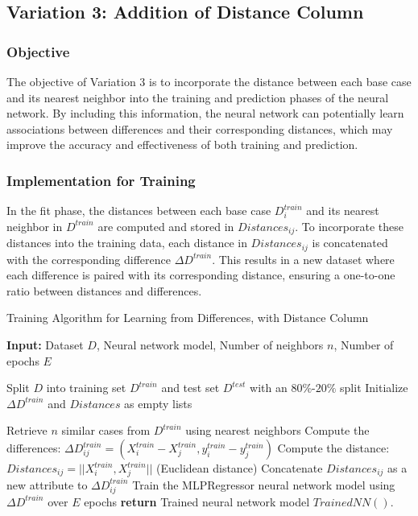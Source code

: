 \documentclass[a4paper, 12pt]{report}
\begin{document}
\subsection{Variation 3: Addition of Distance Column}

\subsubsection{Objective}
The objective of Variation 3 is to incorporate the distance between each base case and its nearest neighbor into the training and prediction phases of the neural network.
By including this information, the neural network can potentially learn associations between differences and their corresponding distances,
which may improve the accuracy and effectiveness of both training and prediction.

\subsubsection{Implementation for Training}
In the fit phase, the distances between each base case $D^{train}_i$ and its nearest neighbor in $D^{train}$ are computed and stored in $Distances_{ij}$.
To incorporate these distances into the training data, each distance in $Distances_{ij}$ is concatenated with the corresponding difference $\Delta D^{train}$.
This results in a new dataset where each difference is paired with its corresponding distance, ensuring a one-to-one ratio between distances and differences.

\begin{algorithm}[H]
    \caption{Training Algorithm for Learning from Differences, with Distance Column}
    \label{alg:learning_from_differences_variant_3_train}
    
    \textbf{Input:} Dataset $D$, Neural network model, Number of neighbors $n$, Number of epochs $E$
    
    \begin{algorithmic}[1]
        \State Split $D$ into training set $D^{train}$ and test set $D^{test}$ with an 80\%-$20\%$ split
        \State Initialize $\Delta D^{train}$ and $Distances$ as empty lists
        
            \State Retrieve $n$ similar cases from $D^{train}$ using nearest neighbors
                \State Compute the differences: $\Delta D^{train}_{ij} = (X^{train}_i - X^{train}_j, y^{train}_i - y^{train}_j)$
                \State Compute the distance: $Distances_{ij} = ||X^{train}_i, X^{train}_j||$ (Euclidean distance)
                \State Concatenate $Distances_{ij}$ as a new attribute to $\Delta D^{train}_{ij}$
            \EndFor
        \EndFor      
        \State Train the MLPRegressor neural network model using $\Delta D^{train}$ over $E$ epochs  
        \State \textbf{return} Trained neural network model $Trained NN()$.
    \end{algorithmic}
\end{algorithm}
\end{document}
